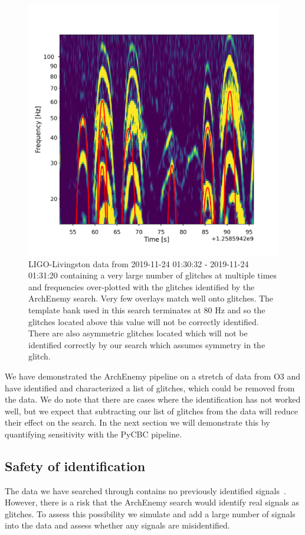 \begin{figure}
       \centering
    \includegraphics[width=0.7\linewidth]{images/4_archenemy/Section3/3.7/overlay_bad_overlays.pdf}
    \caption{LIGO-Livingston data from 2019-11-24 01:30:32 - 2019-11-24 01:31:20 containing a very large number of \scl{} glitches at multiple times and frequencies over-plotted with the \scl{} glitches identified by the ArchEnemy search. Very few overlays match well onto \scl{} glitches. The template bank used in this search terminates at $80$ Hz and so the \scl{} glitches located above this value will not be correctly identified. There are also asymmetric \scl{} glitches located which will not be identified correctly by our search which assumes symmetry in the \scl{} glitch.}
    \label{4:fig:overlay_bads}
\end{figure}

We have demonstrated the ArchEnemy pipeline on a stretch of data from O3 and have identified and characterized a list of \scl{} glitches, which could be removed from the data. We do note that there are cases where the identification has not worked well, but we expect that subtracting our list of glitches from the data will reduce their effect on the \gw{} search. In the next section we will demonstrate this by quantifying sensitivity with the PyCBC pipeline.

\subsection{Safety of \scl{} identification}
\label{4:ssec:injsafety}

The data we have searched through contains no previously identified \gw{} signals~\cite{gwtc3:2023}. However, there is a risk that the ArchEnemy search would identify real \gw{} signals as \scl{} glitches. To assess this possibility we simulate and add a large number of \gw{} signals into the data and assess whether any signals are misidentified.

